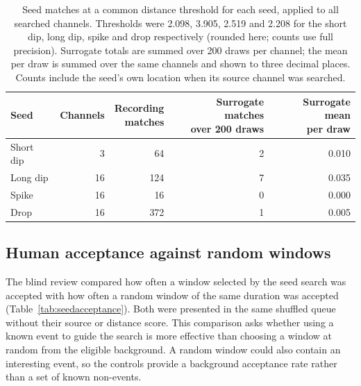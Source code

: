 \begin{table}[htbp]
\caption[{Seed matches at a common distance threshold.}]{Seed matches at a common distance threshold for each seed, applied to all searched channels. Thresholds were 2.098, 3.905, 2.519 and 2.208 for the short dip, long dip, spike and drop respectively (rounded here; counts use full precision). Surrogate totals are summed over 200 draws per channel; the mean per draw is summed over the same channels and shown to three decimal places. Counts include the seed's own location when its source channel was searched.}
\label{tab:seeds}
\small
\centering
\begin{tabularx}{\textwidth}{@{}Xrrrr@{}}
\toprule
\textbf{Seed} & \textbf{Channels} & \makecell[r]{\textbf{Recording}\\\textbf{matches}} & \makecell[r]{\textbf{Surrogate matches}\\\textbf{over 200 draws}} & \makecell[r]{\textbf{Surrogate mean}\\\textbf{per draw}}\\
\midrule
Short dip & 3 & 64 & 2 & 0.010\\
Long dip & 16 & 124 & 7 & 0.035\\
Spike & 16 & 16 & 0 & 0.000\\
Drop & 16 & 372 & 1 & 0.005\\
\bottomrule
\end{tabularx}
\end{table}


\subsection{Human acceptance against random windows}
\label{sec:seedacceptance}

The blind review compared how often a window selected by the seed search was accepted with how often a random window of the same duration was accepted (Table~\ref{tab:seedacceptance}). Both were presented in the same shuffled queue without their source or distance score. This comparison asks whether using a known event to guide the search is more effective than choosing a window at random from the eligible background. A random window could also contain an interesting event, so the controls provide a background acceptance rate rather than a set of known non-events.

